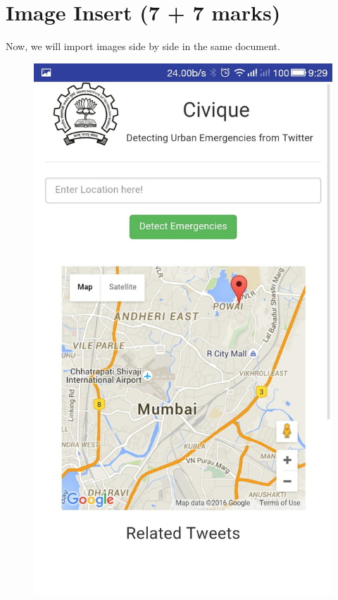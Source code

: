 \documentclass{article}
\begin{document}
\newcommand\myblockquote[2]{%
  \blockquote{\hspace*{2em}"#1"}\par}



\section{Image Insert (7 + 7 marks)}
\hspace*{3em} \large{ Now, we will import images side by side in the same document.}
\begin{figure}[H]
\centering

\begin{minipage}{.45\linewidth}
  \includegraphics[width=0.95\linewidth ,height=1.6\linewidth]{1}
  

\end{minipage}
\end{figure}
\end{document}
